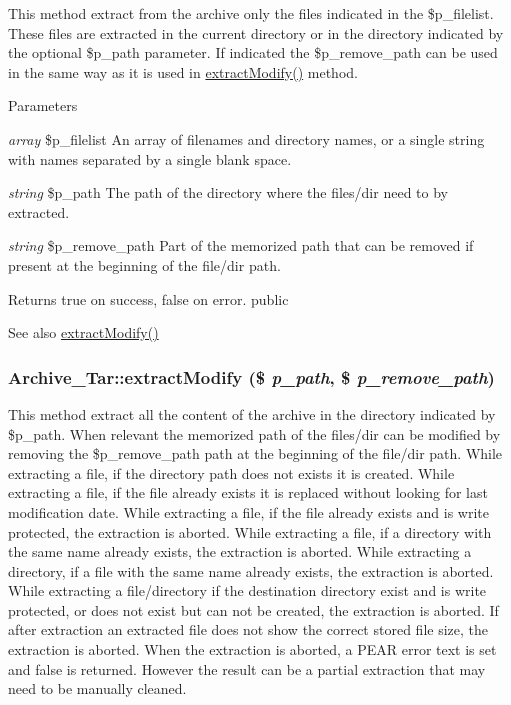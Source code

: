 \label{classArchive__Tar_af670430ca3efa3f4850a2cd1347c7d59}
This method extract from the archive only the files indicated in the \$p\_\-filelist. These files are extracted in the current directory or in the directory indicated by the optional \$p\_\-path parameter. If indicated the \$p\_\-remove\_\-path can be used in the same way as it is used in \hyperlink{classArchive__Tar_ad15a78b140633ef64481df2d0d9e499b}{extractModify()} method. 
\begin{DoxyParams}{Parameters}
\item[{\em array}]\$p\_\-filelist An array of filenames and directory names, or a single string with names separated by a single blank space. \item[{\em string}]\$p\_\-path The path of the directory where the files/dir need to by extracted. \item[{\em string}]\$p\_\-remove\_\-path Part of the memorized path that can be removed if present at the beginning of the file/dir path. \end{DoxyParams}
\begin{DoxyReturn}{Returns}
true on success, false on error.  public 
\end{DoxyReturn}
\begin{DoxySeeAlso}{See also}
\hyperlink{classArchive__Tar_ad15a78b140633ef64481df2d0d9e499b}{extractModify()} 
\end{DoxySeeAlso}
\hypertarget{classArchive__Tar_ad15a78b140633ef64481df2d0d9e499b}{
\subsubsection[{extractModify}]{\setlength{\rightskip}{0pt plus 5cm}Archive\_\-Tar::extractModify (\$ {\em p\_\-path}, \/  \$ {\em p\_\-remove\_\-path})}}
\label{classArchive__Tar_ad15a78b140633ef64481df2d0d9e499b}
This method extract all the content of the archive in the directory indicated by \$p\_\-path. When relevant the memorized path of the files/dir can be modified by removing the \$p\_\-remove\_\-path path at the beginning of the file/dir path. While extracting a file, if the directory path does not exists it is created. While extracting a file, if the file already exists it is replaced without looking for last modification date. While extracting a file, if the file already exists and is write protected, the extraction is aborted. While extracting a file, if a directory with the same name already exists, the extraction is aborted. While extracting a directory, if a file with the same name already exists, the extraction is aborted. While extracting a file/directory if the destination directory exist and is write protected, or does not exist but can not be created, the extraction is aborted. If after extraction an extracted file does not show the correct stored file size, the extraction is aborted. When the extraction is aborted, a PEAR error text is set and false is returned. However the result can be a partial extraction that may need to be manually cleaned.



